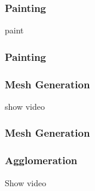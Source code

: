 \documentclass[aspectratio=169]{beamer}
\begin{document}
    \def\colorOne{red}
    \def\colorTwo{blue}
    \def\colorThree{yellow}
    \def\colorFour{green}
    \def\colorFive{magenta}
    \def\cellSize{1.4em}
\begin{frame}
    \frametitle{Painting}
    {paint}
\end{frame}

\begin{frame}
    \frametitle{Painting}
\end{frame}

\begin{frame}
    \frametitle{Mesh Generation}
    show video
\end{frame}

\begin{frame}
    \frametitle{Mesh Generation}
    \centering
\end{frame}

\begin{frame}
    \frametitle{Agglomeration}
    Show video
\end{frame}
\end{document}
